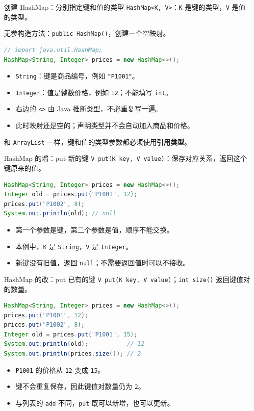 \documentclass[aspectratio=169]{beamer}
\begin{document}
\begin{frame}[fragile]{创建 HashMap：分别指定键和值的类型}
  \texttt{HashMap<K, V>}：\texttt{K} 是键的类型，\texttt{V} 是值的类型。
  \par\medskip
  无参构造方法：\texttt{public HashMap()}，创建一个空映射。
  \begin{lstlisting}[language=Java]
// import java.util.HashMap;
HashMap<String, Integer> prices = new HashMap<>();
  \end{lstlisting}
  \begin{itemize}
    \item \texttt{String}：键是商品编号，例如 \texttt{"P1001"}。
    \item \texttt{Integer}：值是整数价格，例如 \texttt{12}；不能填写 \texttt{int}。
    \item 右边的 \texttt{<>} 由 Java 推断类型，不必重复写一遍。
    \item 此时映射还是空的；声明类型并不会自动加入商品和价格。
  \end{itemize}
  \medskip
  和 \texttt{ArrayList} 一样，键和值的类型参数都必须使用\textbf{引用类型}。
\end{frame}

\begin{frame}[fragile]{HashMap 的增：put 新的键}
  \texttt{V put(K key, V value)}：保存对应关系，返回这个键原来的值。
  \begin{lstlisting}[language=Java]
HashMap<String, Integer> prices = new HashMap<>();
Integer old = prices.put("P1001", 12);
prices.put("P1002", 8);
System.out.println(old); // null
  \end{lstlisting}
  \begin{itemize}
    \item 第一个参数是键，第二个参数是值，顺序不能交换。
    \item 本例中，\texttt{K} 是 \texttt{String}，\texttt{V} 是 \texttt{Integer}。
    \item 新键没有旧值，返回 \texttt{null}；不需要返回值时可以不接收。
  \end{itemize}
\end{frame}

\begin{frame}[fragile]{HashMap 的改：put 已有的键}
  \texttt{V put(K key, V value)}；\texttt{int size()} 返回键值对的数量。
  \begin{lstlisting}[language=Java]
HashMap<String, Integer> prices = new HashMap<>();
prices.put("P1001", 12);
prices.put("P1002", 8);
Integer old = prices.put("P1001", 15);
System.out.println(old);           // 12
System.out.println(prices.size()); // 2
  \end{lstlisting}
  \begin{itemize}
    \item \texttt{P1001} 的价格从 \texttt{12} 变成 \texttt{15}。
    \item 键不会重复保存，因此键值对数量仍为 \texttt{2}。
    \item 与列表的 \texttt{add} 不同，\texttt{put} 既可以新增，也可以更新。
  \end{itemize}
\end{frame}
\end{document}
